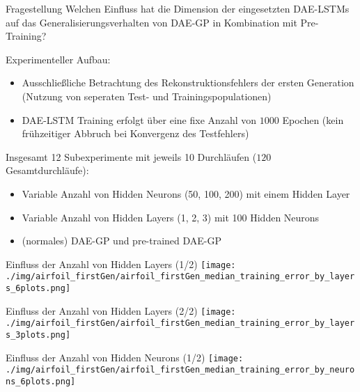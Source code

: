 \documentclass[
  ignorenonframetext,
]{beamer}
\providecommand{\tightlist}{%
  \setlength{\itemsep}{0pt}\setlength{\parskip}{0pt}}
\begin{document}
\begin{frame}{Fragestellung}
\protect\hypertarget{fragestellung}{}
Welchen Einfluss hat die Dimension der eingesetzten DAE-LSTMs auf das
Generalisierungsverhalten von DAE-GP in Kombination mit Pre-Training?

Experimenteller Aufbau:

\begin{itemize}
\tightlist
\item
  Ausschließliche Betrachtung des Rekonstruktionsfehlers der ersten
  Generation (Nutzung von seperaten Test- und Trainingspopulationen)
\item
  DAE-LSTM Training erfolgt über eine fixe Anzahl von \(1000\) Epochen
  (kein frühzeitiger Abbruch bei Konvergenz des Testfehlers)
\end{itemize}

Insgesamt 12 Subexperimente mit jeweils 10 Durchläufen (\(120\)
Gesamtdurchläufe):

\begin{itemize}
\tightlist
\item
  Variable Anzahl von Hidden Neurons (50, 100, 200) mit einem Hidden
  Layer
\item
  Variable Anzahl von Hidden Layers (1, 2, 3) mit 100 Hidden Neurons
\item
  (normales) DAE-GP und pre-trained DAE-GP
\end{itemize}
\end{frame}

\begin{frame}{Einfluss der Anzahl von Hidden Layers (1/2)}
\protect\hypertarget{einfluss-der-anzahl-von-hidden-layers-12}{}
\texttt{[image: ./img/airfoil\_firstGen/airfoil\_firstGen\_median\_training\_error\_by\_layers\_6plots.png]}
\end{frame}

\begin{frame}{Einfluss der Anzahl von Hidden Layers (2/2)}
\protect\hypertarget{einfluss-der-anzahl-von-hidden-layers-22}{}
\texttt{[image: ./img/airfoil\_firstGen/airfoil\_firstGen\_median\_training\_error\_by\_layers\_3plots.png]}
\end{frame}

\begin{frame}{Einfluss der Anzahl von Hidden Neurons (1/2)}
\protect\hypertarget{einfluss-der-anzahl-von-hidden-neurons-12}{}
\texttt{[image: ./img/airfoil\_firstGen/airfoil\_firstGen\_median\_training\_error\_by\_neurons\_6plots.png]}
\end{frame}
\end{document}
